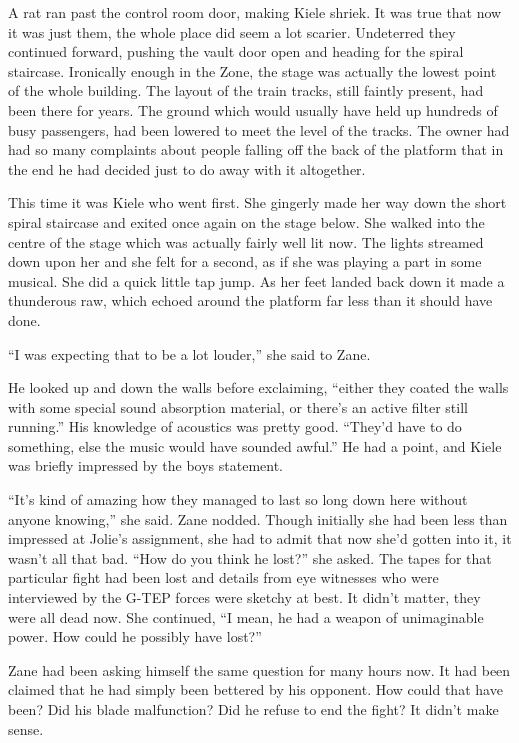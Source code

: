 A rat ran past the control room door, making Kiele shriek.  It was true that now it was just them, the whole place did seem a lot scarier.  Undeterred they continued forward, pushing the vault door open and heading for the spiral staircase.  Ironically enough in the Zone, the stage was actually the lowest point of the whole building.  The layout of the train tracks, still faintly present, had been there for years.  The ground which would usually have held up hundreds of busy passengers, had been lowered to meet the level of the tracks.  The owner had had so many complaints about people falling off the back of the platform that in the end he had decided just to do away with it altogether.  

This time it was Kiele who went first.  She gingerly made her way down the short spiral staircase and exited once again on the stage below.  She walked into the centre of the stage which was actually fairly well lit now.  The lights streamed down upon her and she felt for a second, as if she was playing a part in some musical.  She did a quick little tap jump.  As her feet landed back down it made a thunderous raw, which echoed around the platform far less than it should have done.  

``I was expecting that to be a lot louder,'' she said to Zane.

He looked up and down the walls before exclaiming, ``either they coated the walls with some special sound absorption material, or there's an active filter still running.''  His knowledge of acoustics was pretty good.  ``They'd have to do something, else the music would have sounded awful.''  He had a point, and Kiele was briefly impressed by the boys statement.

``It's kind of amazing how they managed to last so long down here without anyone knowing,'' she said.  Zane nodded.  Though initially she had been less than impressed at Jolie's assignment, she had to admit that now she'd gotten into it, it wasn't all that bad.  ``How do you think he lost?'' she asked.  The tapes for that particular fight had been lost and details from eye witnesses who were interviewed by the G-TEP forces were sketchy at best.  It didn't matter, they were all dead now.  She continued, ``I mean, he had a weapon of unimaginable power.  How could he possibly have lost?''

Zane had been asking himself the same question for many hours now.  It had been claimed that he had simply been bettered by his opponent.  How could that have been?  Did his blade malfunction?  Did he refuse to end the fight?  It didn't make sense.  

